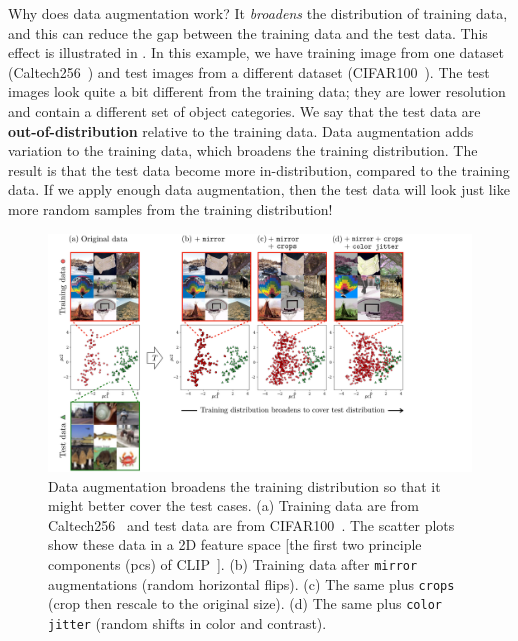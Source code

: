 Why does data augmentation work? It \textit{broadens} the distribution of training data, and this can reduce the gap between the training data and the test data. This effect is illustrated in \fig{\ref{fig:data_augmentation:data_aug_real_example}}. In this example, we have training image from one dataset (Caltech256~\cite{griffin2007caltech}) and test images from a different dataset (CIFAR100~\cite{cifar100}). The test images look quite a bit different from the training data; they are lower resolution and contain a different set of object categories. We say that the test data are \textbf{out-of-distribution} relative to the training data. Data augmentation adds variation to the training data, which broadens the training distribution. The result is that the test data become more in-distribution, compared to the training data. If we apply enough data augmentation, then the test data will look just like more random samples from the training distribution!
\begin{figure}[h]
    \centerline{
    \includegraphics[width=1.0\linewidth]{./figures/data_augmentation/data_aug_real_example.pdf}
    }
    \caption{Data augmentation broadens the training distribution so that it might better cover the test cases. (a) Training data are from Caltech256~\cite{griffin2007caltech} and test data are from CIFAR100~\cite{cifar100}. The scatter plots show these data in a 2D feature space [the first two principle components (pcs) of CLIP~\cite{radford2021learning}]. (b) Training data after \texttt{mirror} augmentations (random horizontal flips). (c) The same plus \texttt{crops} (crop then rescale to the original size). (d) The same plus \texttt{color jitter} (random shifts in color and contrast).}
    \label{fig:data_augmentation:data_aug_real_example}
\end{figure}

